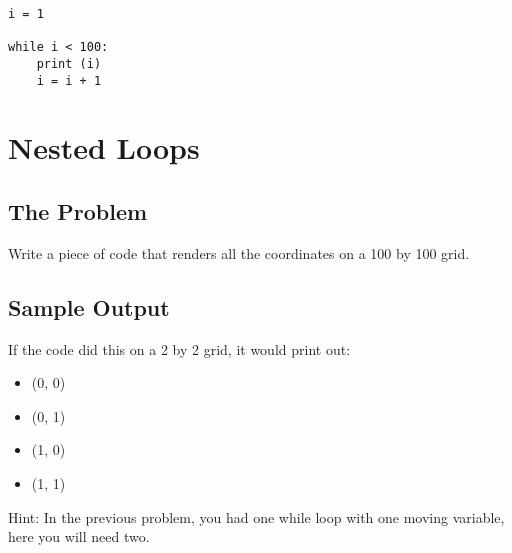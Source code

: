 \documentclass[11pt]{article}
\begin{document}
\begin{verbatim}
i = 1

while i < 100:
    print (i)
    i = i + 1
\end{verbatim}
\section{Nested Loops}
\label{sec:org82fac87}
\subsection{The Problem}
\label{sec:orgc065df9}
Write a piece of code that renders all the coordinates on a 100 by 100 grid.
\subsection{Sample Output}
\label{sec:org26a31f0}
If the code did this on a 2 by 2 grid, it would print out:
\begin{itemize}
\item (0, 0)
\item (0, 1)
\item (1, 0)
\item (1, 1)
\end{itemize}

Hint: In the previous problem, you had one while loop with one moving variable, here you will need two.
\end{document}
